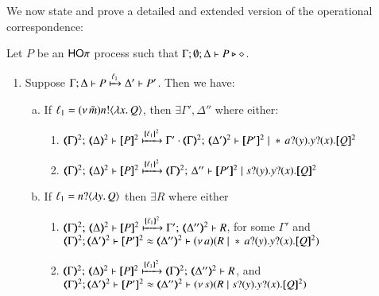 We now state and prove a detailed and extended
version of the operational correspondence:

\begin{proposition}\myrm
	\label{app:prop:op_corr_HOp_to_p}
	Let $P$ be an  $\mathsf{HO}\pi$ process such that  $\Gamma; \emptyset; \Delta \vdash P \triangleright \diamond$.
	
	\begin{enumerate}[1.]
		\item Suppose $\Gamma; \Delta \vdash P \xmapsto{\ell_1} \Delta' \vdash P'$.
		Then we have:
		\begin{enumerate}[a)]
			\item
				If  $\ell_1 = (\nu\, \tilde{m})n ! \langle \lambda x.\,Q \rangle$,
				then $\exists \Gamma', \Delta''$ where either:
				\begin{enumerate}[-]
					\item 
						$\tmap{\Gamma}{2};\, \tmap{\Delta}{2} \proves  \pmap{P}{2} 
						\hby{\mapa{\ell_1}^{2}}
						\Gamma' \cdot \tmap{\Gamma}{2};\, \tmap{\Delta'}{2} \proves \pmap{P'}{2} \Par \repl{} \binp{a}{y} \binp{y}{x} \pmap{Q}{2}$
					\item 
						$\tmap{\Gamma}{2};\, \tmap{\Delta}{2} \proves \pmap{P}{2} 
						\hby{\mapa{\ell_1}^{2}}
						\tmap{\Gamma}{2};\, \Delta'' \proves \pmap{P'}{2} \Par \binp{s}{y} \binp{y}{x} \pmap{Q}{2}$
				\end{enumerate}

			\item
				If   
				$\ell_1 = n ? \langle \lambda y.\,Q \rangle$
				then $\exists R$ where
				either
				\begin{enumerate}[-]
					\item 
						$\tmap{\Gamma}{2};\, \tmap{\Delta}{2} \proves \pmap{P}{2} 
						\hby{\mapa{\ell_1}^{2}}
						\Gamma';\, \tmap{\Delta''}{2} \proves  R$, for some $ \Gamma'$
						and \\ 
						$\horel{\tmap{\Gamma}{2}}{\tmap{\Delta'}{2}}{\pmap{P'}{2}}{\wb}{\tmap{\Delta''}{2}}{\newsp{a}{R \Par \repl{} \binp{a}{y} \binp{y}{x} \pmap{Q}{2}}}$
					\item 
						$\tmap{\Gamma}{2};\, \tmap{\Delta}{2} \proves \pmap{P}{2}
						\hby{\mapa{\ell_1}^{2}}
						\tmap{\Gamma}{2};\, \tmap{\Delta''}{2} \proves R$, 
						and \\ 
						$\horel{\tmap{\Gamma}{2}}{\tmap{\Delta'}{2}}{\pmap{P'}{2}}{\wb}{\tmap{\Delta''}{2}}{\newsp{s}{R \Par \binp{s}{y} \binp{y}{x} \pmap{Q}{2}}}$  		
				\end{enumerate}


\end{enumerate}
\end{enumerate}
\end{proposition}
